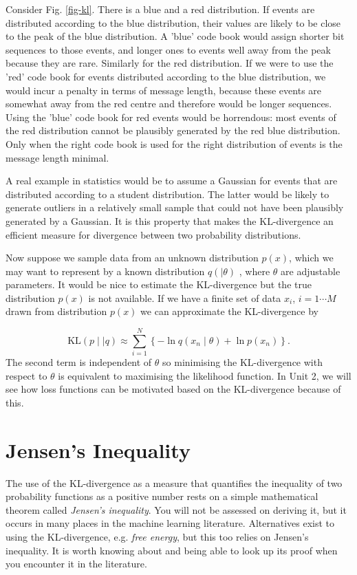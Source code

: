 Consider Fig. \ref{fig-kl}. There is a blue and a red distribution. If events are distributed according to the blue distribution, their values are likely to be close
to the peak of the blue distribution. A 'blue' code book would assign shorter bit sequences to those events, and longer ones to events well away from the peak because
they are rare. Similarly for the red distribution. If we were to use the 'red' code book for events distributed according to the blue distribution, we would incur a penalty
in terms of message length, because these events are somewhat away from the red centre and therefore would be longer sequences. Using the 'blue' code book
for red events would be horrendous: most events of the red distribution cannot be plausibly generated by the red blue distribution. Only when the right code book
is used for the right distribution of events is the message length minimal.

A real example in statistics would be to assume a Gaussian for events that are distributed according to a student distribution. The latter would be likely to generate
outliers in a relatively small sample that could not have been plausibly generated by a Gaussian. It is this property that makes the KL-divergence an efficient
measure for divergence between two probability distributions.

Now suppose we sample data from an unknown distribution $p(x)$, which we may want to represent by a known distribution $q( \mid \theta)$ , where $\theta$
are adjustable parameters. It would be nice to estimate the KL-divergence but the true distribution $p(x)$ is not available. If we have a finite set
of data $x_i$, $i = 1 \cdots M$ drawn from distribution $p(x)$ we can approximate the KL-divergence by

$$
\mbox{KL}( p \mid \mid q) \approx \sum^N_{i=1} \left\{ -\ln q(x_n \mid \theta) + \ln p(x_n) \right\}.
$$
The second term is independent of $\theta$ so minimising the KL-divergence with respect to $\theta$ is equivalent to maximising the likelihood function. In Unit 2, we will
see how loss functions can be motivated based on the KL-divergence because of this.
    
\section{Jensen's Inequality}
The use of the KL-divergence as a measure that quantifies the inequality of two probability functions as a positive number rests on a simple mathematical theorem
called \emph{Jensen's inequality}. You will not be assessed on deriving it, but it occurs in many places in the machine learning literature. Alternatives exist to using
the KL-divergence, e.g. \emph{free energy}, but this too relies on Jensen's inequality. It is worth knowing about and being able to look up its proof when you encounter
it in the literature.


